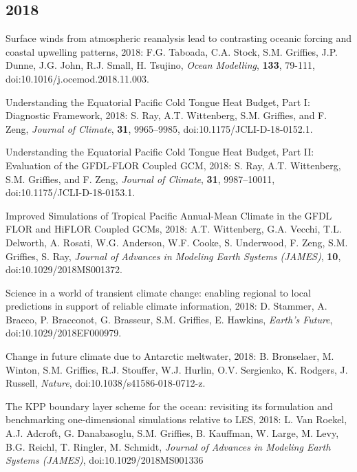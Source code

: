 \begin{etaremune}
\subsection*{\sc \color{Maroon} 2018}


\item Surface winds from atmospheric reanalysis lead to contrasting oceanic forcing and coastal upwelling patterns, 2018: F.G. Taboada, C.A. Stock, S.M. Grif\/f\/ies, J.P. Dunne, J.G. John, R.J. Small, H. Tsujino, {\it Ocean Modelling}, {\bf 133}, 79-111, 
doi:10.1016/j.ocemod.2018.11.003.

\item Understanding the Equatorial Pacific Cold Tongue Heat Budget, Part I: Diagnostic Framework, 2018: S. Ray, A.T. Wittenberg, S.M. Grif\/f\/ies, and F. Zeng, {\it Journal of Climate}, {\bf 31}, 9965--9985, doi:10.1175/JCLI-D-18-0152.1. 

\item Understanding the Equatorial Pacific Cold Tongue Heat Budget, Part II: Evaluation of the GFDL-FLOR Coupled GCM, 2018: S. Ray, A.T. Wittenberg, S.M. Grif\/f\/ies, and F. Zeng, {\it Journal of Climate}, {\bf 31}, 9987--10011, doi:10.1175/JCLI-D-18-0153.1.

\item Improved Simulations of Tropical Pacific Annual-Mean Climate in the GFDL FLOR and HiFLOR Coupled GCMs, 2018:  A.T. Wittenberg, G.A. Vecchi, T.L. Delworth, A. Rosati, W.G. Anderson, W.F. Cooke, S. Underwood, F. Zeng, S.M. Grif\/f\/ies, S. Ray, {\it Journal of Advances in Modeling Earth Systems (JAMES)}, {\bf 10}, doi:10.1029/2018MS001372. 

\item Science in a world of transient climate change: enabling regional to local predictions in support of reliable climate information, 2018: D. Stammer, A. Bracco, P. Bracconot, G. Brasseur, S.M. Grif\/f\/ies, E. Hawkins, {\it Earth's Future}, \\ doi:10.1029/2018EF000979.

\item Change in future climate due to Antarctic meltwater, 2018: B. Bronselaer, M. Winton, S.M. Grif\/f\/ies, R.J. Stouffer, W.J. Hurlin, O.V. Sergienko, K. Rodgers, J. Russell, {\it  Nature}, doi:10.1038/s41586-018-0712-z.

\item The KPP boundary layer scheme for the ocean: revisiting its formulation and benchmarking one-dimensional simulations relative to LES,  2018: L. Van Roekel, A.J.  Adcroft, G. Danabasoglu, S.M. Grif\/f\/ies, B. Kauffman, W. Large, M. Levy, B.G. Reichl, T. Ringler, M. Schmidt, {\it Journal of Advances in Modeling Earth Systems (JAMES)}, doi:10.1029/2018MS001336


\end{etaremune}
